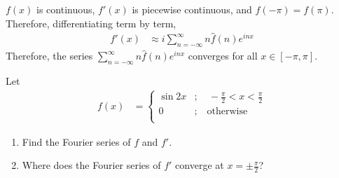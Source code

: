 \documentclass[fleqn, a4paper, 11pt, oneside]{amsart}
\theoremstyle{definition}
\theoremstyle{theorem}
\begin{document}
\begin{solution}
	$f(x)$ is continuous, $f'(x)$ is piecewise continuous, and $f(-\pi) = f(\pi)$.\\
	Therefore, differentiating term by term,
	\begin{align*}
		f'(x) & \approx i \sum\limits_{n = -\infty}^{\infty} n \hat{f}(n) e^{i n x}
	\end{align*}
	Therefore, the series $\sum\limits_{n = -\infty}^{\infty} n \hat{f}(n) e^{i n x}$ converges for all $x \in [-\pi,\pi]$.
\end{solution}

\begin{question}
	Let
	\begin{align*}
		f(x) &=
			\begin{cases}
				\sin 2 x & ;\quad -\frac{\pi}{2} < x < \frac{\pi}{2} \\
				0        & ;\quad \text{otherwise}                   \\
			\end{cases}
	\end{align*}
	\begin{enumerate}
		\item Find the Fourier series of $f$ and $f'$.
		\item Where does the Fourier series of $f'$ converge at $x = \pm \frac{\pi}{2}$?
	\end{enumerate}
\end{question}
\end{document}
